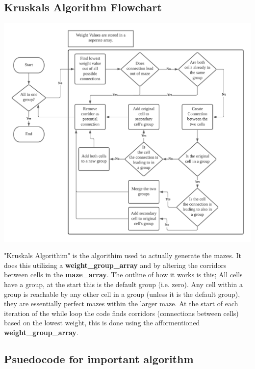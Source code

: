 \documentclass{article}
\begin{document}
\subsection{Kruskals Algorithm Flowchart}
\begin{center}
	\includegraphics[scale=0.97]{Kruskals}
\end{center}
"Kruskals Algorithim" is the algorithim used to actually generate the mazes. It does this utilizing a \textbf{weight\_group\_array} and by altering
the corridors between cells in the \textbf{maze\_array}. The outline of how it works is this; All cells have a group, at the start this is the default group (i.e. zero).
Any cell within a group is reachable by any other cell in a group (unless it is the default group), they are essentially perfect mazes within the larger maze.
At the start of each iteration of the while loop the code finds corridors (connections between cells) based on the lowest weight, this is done using the afformentioned
\textbf{weight\_group\_array}.
\clearpage
\subsection{Psuedocode for important algorithm}
\end{document}
